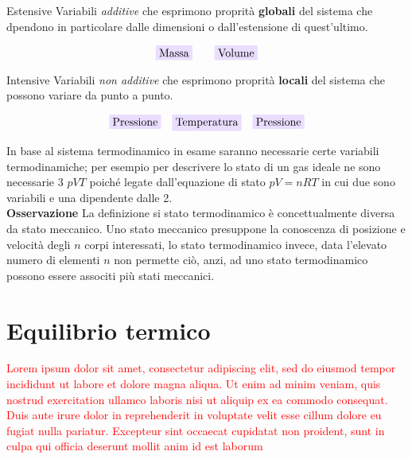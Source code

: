 \documentclass[x11names]{report}
\newcommand{\viola}[1]{\colorbox{yred}{$\displaystyle #1$}}
\begin{document}
	\begin{center}
		\begin{minipage}{0.49\textwidth}
			\begin{es}{Estensive}
				Variabili \textit{additive} che esprimono proprità \textbf{globali} del sistema che dpendono in particolare dalle dimensioni o dall'estensione di quest'ultimo.
				
				\[\viola{\text{Massa}} \qquad \viola{\text{Volume}}\]
				
			\end{es}
		\end{minipage}
		\begin{minipage}{0.49\textwidth}
			\begin{es}{Intensive}
				Variabili \textit{non additive} che esprimono proprità \textbf{locali} del sistema che possono variare da punto a punto.
				
				\[\viola{\text{Pressione}} \quad \viola{\text{Temperatura}}\quad \viola{\text{Pressione}}\]
				
			\end{es}
		\end{minipage}
	\end{center}
	In base al sistema termodinamico in esame saranno necessarie certe variabili termodinamiche; per esempio per descrivere lo stato di un gas ideale ne sono necessarie 3 \(pVT\) poiché legate dall'equazione di stato \( pV = nRT\) in cui due sono variabili e una dipendente dalle 2.\\
	
	\noindent
	\textbf{Osservazione}  La definizione si stato termodinamico è concettualmente diversa da stato meccanico. Uno stato meccanico presuppone la conoscenza di posizione e velocità degli \(n\) corpi interessati, lo stato termodinamico invece, data l'elevato numero di elementi \(n\) non permette ciò, anzi, ad uno stato termodinamico possono essere associti più stati meccanici.
	
	\section{Equilibrio termico}
	\textcolor{red}{Lorem ipsum dolor sit amet, consectetur adipiscing elit, sed do eiusmod tempor incididunt ut labore et dolore magna aliqua. Ut enim ad minim veniam, quis nostrud exercitation ullamco laboris nisi ut aliquip ex ea commodo consequat. Duis aute irure dolor in reprehenderit in voluptate velit esse cillum dolore eu fugiat nulla pariatur. Excepteur sint occaecat cupidatat non proident, sunt in culpa qui officia deserunt mollit anim id est laborum}\\
	
\end{document}

